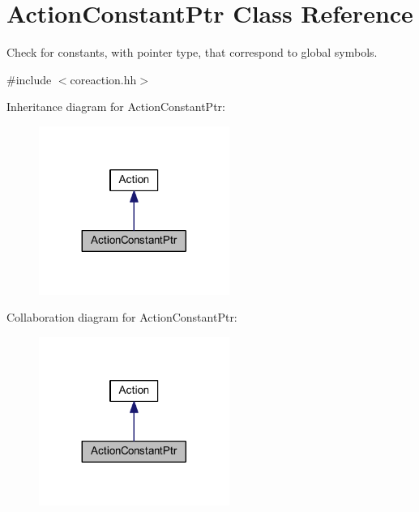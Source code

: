 \hypertarget{class_action_constant_ptr}{}\section{Action\+Constant\+Ptr Class Reference}
\label{class_action_constant_ptr}


Check for constants, with pointer type, that correspond to global symbols.  




{\ttfamily \#include $<$coreaction.\+hh$>$}



Inheritance diagram for Action\+Constant\+Ptr\+:
\nopagebreak
\begin{figure}[H]
\begin{center}
\leavevmode
\includegraphics[width=176pt]{class_action_constant_ptr__inherit__graph}
\end{center}
\end{figure}


Collaboration diagram for Action\+Constant\+Ptr\+:
\nopagebreak
\begin{figure}[H]
\begin{center}
\leavevmode
\includegraphics[width=176pt]{class_action_constant_ptr__coll__graph}
\end{center}
\end{figure}
